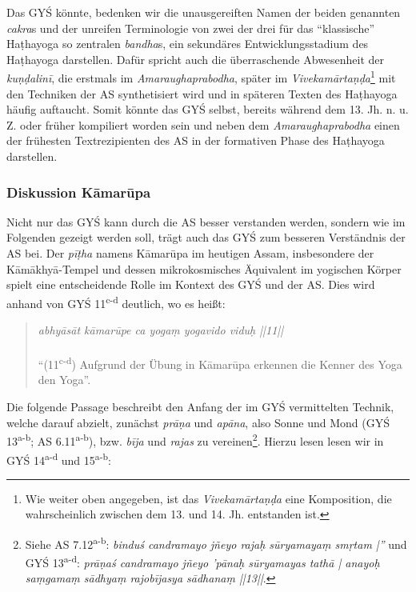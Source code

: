 \documentclass[a4paper,12pt]{article}
\begin{document}
Das GYŚ könnte, bedenken wir die unausgereiften Namen der beiden genannten \textit{cakra}s und der unreifen Terminologie von zwei der drei für das ``klassische'' Haṭhayoga so zentralen \textit{bandha}s, ein sekundäres Entwicklungsstadium des Haṭhayoga darstellen. Dafür spricht auch die überraschende Abwesenheit der \textit{kuṇḍalinī}, die erstmals im \textit{Amaraughaprabodha}, später im \textit{Vivekamārtaṇḍa}\footnote{Wie weiter oben angegeben, ist das \textit{Vivekamārtaṇḍa} eine Komposition, die wahrscheinlich zwischen dem 13. und 14. Jh. entstanden ist.} mit den Techniken der AS synthetisiert wird und in späteren Texten des Haṭhayoga häufig auftaucht. Somit könnte das GYŚ selbst, bereits während dem 13. Jh. n. u. Z. oder früher kompiliert worden sein und neben dem \textit{Amaraughaprabodha} einen der frühesten Textrezipienten des AS in der formativen Phase des Haṭhayoga darstellen.

\subsubsection{Diskussion Kāmarūpa}
\label{kamarupa}

Nicht nur das GYŚ kann durch die AS besser verstanden werden, sondern wie im Folgenden gezeigt werden soll, trägt auch das GYŚ zum besseren Verständnis der AS bei. Der \textit{pīṭha} namens Kāmarūpa im heutigen Assam, insbesondere der Kāmākhyā-Tempel \parencite[31]{urban2010} und dessen mikrokosmisches Äquivalent im yogischen Körper spielt eine entscheidende Rolle im Kontext des GYŚ und der AS. Dies wird anhand von GYŚ 11\textsuperscript{c-d} deutlich, wo es heißt:

\begin{quote} \textit{abhyāsāt kāmarūpe ca yogaṃ yogavido viduḥ ||11||} \\ \\
``(11\textsuperscript{c-d}) Aufgrund der Übung in Kāmarūpa erkennen die Kenner des Yoga den Yoga''. \end{quote}

Die folgende Passage beschreibt den Anfang der im GYŚ vermittelten Technik, welche darauf abzielt, zunächst \textit{prāṇa} und \textit{apāna}, also Sonne und Mond (GYŚ 13\textsuperscript{a-b}; AS 6.11\textsuperscript{a-b}), bzw. \textit{bīja} und \textit{rajas} zu vereinen\footnote{Siehe AS 7.12\textsuperscript{a-b}: \textit{binduś candramayo jñeyo rajaḥ sūryamayaṃ smṛtam |''} und GYŚ 13\textsuperscript{a-d}: \textit{prāṇaś candramayo jñeyo ’pānaḥ sūryamayas tathā | anayoḥ saṃgamaṃ sādhyaṃ rajobījasya sādhanaṃ ||13||}.}. Hierzu lesen lesen wir in GYŚ 14\textsuperscript{a-d} und 15\textsuperscript{a-b}:
\end{document}
